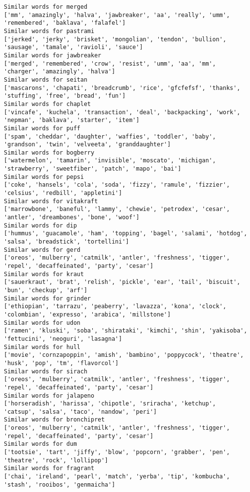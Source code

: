\documentclass[11pt]{article}
\begin{document}
\begin{Verbatim}[commandchars=\\\{\}]
Similar words for merged
['mm', 'amazingly', 'halva', 'jawbreaker', 'aa', 'really', 'umm', 'remembered', 'baklava', 'falafel']
Similar words for pastrami
['jerked', 'jerky', 'brisket', 'mongolian', 'tendon', 'bullion', 'sausage', 'tamale', 'ravioli', 'sauce']
Similar words for jawbreaker
['merged', 'remembered', 'crow', 'resist', 'umm', 'aa', 'mm', 'charger', 'amazingly', 'halva']
Similar words for seitan
['mascarons', 'chapati', 'breadcrumb', 'rice', 'gfcfefsf', 'thanks', 'stuffing', 'free', 'bread', 'fun']
Similar words for chaplet
['vincafe', 'kuchela', 'transaction', 'deal', 'backpacking', 'work', 'nepman', 'baklava', 'starter', 'item']
Similar words for puff
['spam', 'cheddar', 'daughter', 'waffies', 'toddler', 'baby', 'grandson', 'twin', 'velveeta', 'granddaughter']
Similar words for bogberry
['watermelon', 'tamarin', 'invisible', 'moscato', 'michigan', 'strawberry', 'sweetfiber', 'patch', 'mapo', 'bai']
Similar words for pepsi
['coke', 'hansels', 'cola', 'soda', 'fizzy', 'ramule', 'fizzier', 'celsius', 'redbill', 'appletini']
Similar words for vitakraft
['marrowbone', 'baneful', 'lammy', 'chewie', 'petrodex', 'cesar', 'antler', 'dreambones', 'bone', 'woof']
Similar words for dip
['hummus', 'guacamole', 'ham', 'topping', 'bagel', 'salami', 'hotdog', 'salsa', 'breadstick', 'tortellini']
Similar words for gerd
['oreos', 'mulberry', 'catmilk', 'antler', 'freshness', 'tigger', 'repel', 'decaffeinated', 'party', 'cesar']
Similar words for kraut
['sauerkraut', 'brat', 'relish', 'pickle', 'ear', 'tail', 'biscuit', 'bun', 'checkup', 'arf']
Similar words for grinder
['ethiopian', 'tarrazu', 'peaberry', 'lavazza', 'kona', 'clock', 'colombian', 'expresso', 'arabica', 'millstone']
Similar words for udon
['ramen', 'kluski', 'soba', 'shirataki', 'kimchi', 'shin', 'yakisoba', 'fettucini', 'neoguri', 'lasagna']
Similar words for hull
['movie', 'cornzapoppin', 'amish', 'bambino', 'poppycock', 'theatre', 'husk', 'pop', 'tm', 'flavorcol']
Similar words for sirach
['oreos', 'mulberry', 'catmilk', 'antler', 'freshness', 'tigger', 'repel', 'decaffeinated', 'party', 'cesar']
Similar words for jalapeno
['horseradish', 'harissa', 'chipotle', 'sriracha', 'ketchup', 'catsup', 'salsa', 'taco', 'nandow', 'peri']
Similar words for bronchipret
['oreos', 'mulberry', 'catmilk', 'antler', 'freshness', 'tigger', 'repel', 'decaffeinated', 'party', 'cesar']
Similar words for dum
['tootsie', 'tart', 'jiffy', 'blow', 'popcorn', 'grabber', 'pen', 'theatre', 'rock', 'lollipop']
Similar words for fragrant
['chai', 'ireland', 'pearl', 'match', 'yerba', 'tip', 'kombucha', 'stash', 'rooibos', 'genmaicha']

\end{Verbatim}
\end{document}
